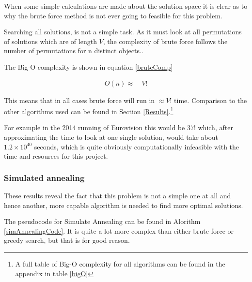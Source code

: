 \documentclass[12pt]{report}
\begin{document}
When some simple calculations are made about the solution space it is clear as to why the brute force method is not ever going to feasible for this problem. 

Searching all solutions, is not a simple task. As it must look at all permutations of solutions which are of length $V$, the complexity of brute force follows the number of permutations for n distinct objects.\cite{Permutation}.

The Big-O complexity is shown in equation \ref{bruteComp}

\begin{equation}\label{bruteComp}
\begin{aligned}
	O(n) \approx{} & \ V!
\end{aligned}
\end{equation}

This means that in all cases brute force will run in $\approx V!$ time. Comparison to the other algorithms used can be found in Section \ref{Results}.\footnote{A full table of Big-O complexity for all algorithms can be found in the appendix in table \ref{bigO}}

For example in the 2014 running of Eurovision this would be $37!$ which, after approximating the time to look at one single solution, would take about $1.2\times10^{40}$ seconds, which is quite obviously computationally infeasible with the time and resources for this project.

\subsubsection{Simulated annealing}
These results reveal the fact that this problem is not a simple one at all and hence another, more capable algorithm is needed to find more optimal solutions. 

The pseudocode for Simulate Annealing can be found in Alorithm \ref{simAnnealingCode}. It is quite a lot more complex than either brute force or greedy search, but that is for good reason.
\end{document}
